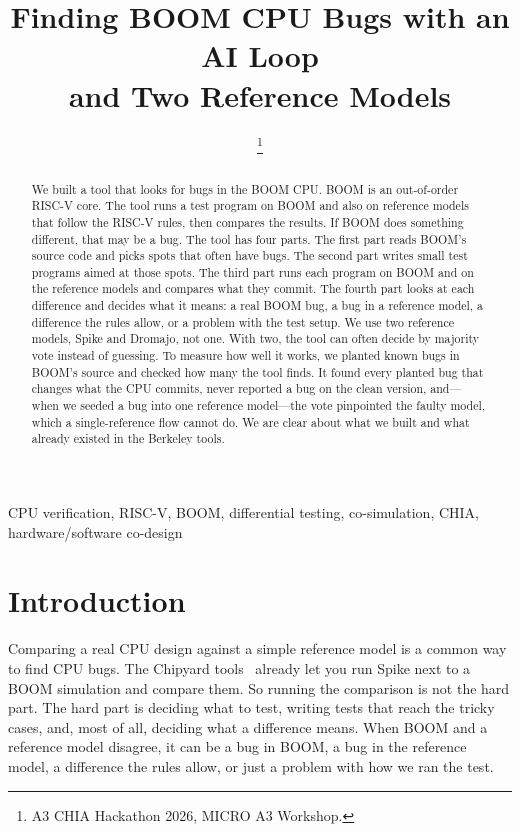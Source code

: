 \documentclass[conference]{IEEEtran}
\begin{document}
\title{Finding BOOM CPU Bugs with an AI Loop\\
and Two Reference Models}

\author{
\thanks{A3 CHIA Hackathon 2026, MICRO A3 Workshop.}}

\maketitle

\begin{abstract}
We built a tool that looks for bugs in the BOOM CPU. BOOM is an out-of-order
RISC-V core. The tool runs a test program on BOOM and also on reference models
that follow the RISC-V rules, then compares the results. If BOOM does something
different, that may be a bug. The tool has four parts. The first part reads
BOOM's source code and picks spots that often have bugs. The second part writes
small test programs aimed at those spots. The third part runs each program on
BOOM and on the reference models and compares what they commit. The fourth part
looks at each difference and decides what it means: a real BOOM bug, a bug in a
reference model, a difference the rules allow, or a problem with the test setup.
We use two reference models, Spike and Dromajo, not one. With two, the tool can
often decide by majority vote instead of guessing. To measure how well it works,
we planted known bugs in BOOM's source and checked how many the tool finds. It
found every planted bug that changes what the CPU commits, never reported a bug
on the clean version, and---when we seeded a bug into one reference model---the
vote pinpointed the faulty model, which a single-reference flow cannot do. We are clear about what we built and what already
existed in the Berkeley tools.
\end{abstract}

\begin{IEEEkeywords}
CPU verification, RISC-V, BOOM, differential testing, co-simulation, CHIA,
hardware/software co-design
\end{IEEEkeywords}

\section{Introduction}
Comparing a real CPU design against a simple reference model is a common way to
find CPU bugs. The Chipyard tools~\cite{chipyard} already let you run Spike next
to a BOOM simulation and compare them. So running the comparison is not the hard
part. The hard part is deciding what to test, writing tests that reach the
tricky cases, and, most of all, deciding what a difference means. When BOOM and
a reference model disagree, it can be a bug in BOOM, a bug in the reference
model, a difference the rules allow, or just a problem with how we ran the test.
\end{document}
